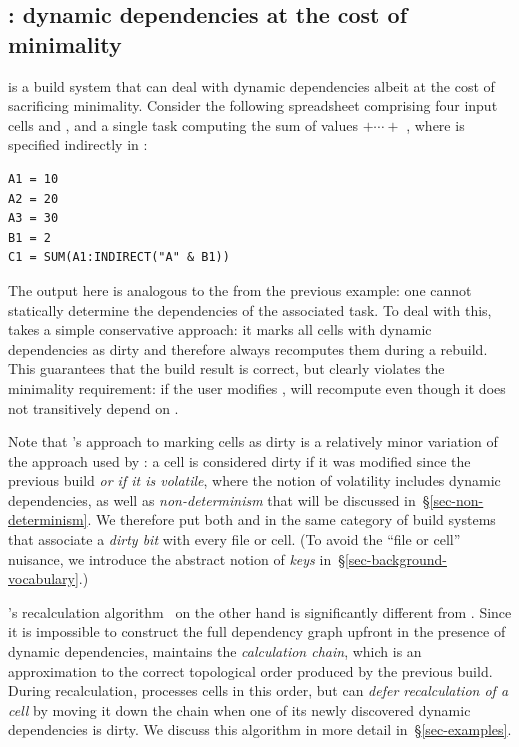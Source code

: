 \subsection{\Excel: dynamic dependencies at the cost of minimality}
\label{sec-background-excel}

\Excel is a build system that can deal with dynamic dependencies albeit at the
cost of sacrificing minimality. Consider the following spreadsheet comprising
four input cells  and , and a single task computing the sum
of values  $+\cdots+$ , where  is specified indirectly in
:

\vspace{1mm}
\begin{verbatim}
A1 = 10
A2 = 20
A3 = 30
B1 = 2
C1 = SUM(A1:INDIRECT("A" & B1))
\end{verbatim}
\vspace{1mm}

\noindent
The output  here is analogous to the  from the previous
example: one cannot statically determine the dependencies of the associated task.
To deal with this, \Excel takes a simple conservative approach: it marks all
cells with dynamic dependencies as dirty and therefore always recomputes them
during a rebuild. This guarantees that the build result is correct, but clearly
violates the minimality requirement: if the user modifies , \Excel will
recompute  even though it does not transitively depend on .

Note that \Excel's approach to marking cells as dirty is a relatively minor
variation of the approach used by \Make: a cell is considered dirty if it was
modified since the previous build \emph{or if it is volatile}, where the notion
of volatility includes dynamic dependencies, as well as \emph{non-determinism}
that will be discussed in~\S\ref{sec-non-determinism}. We therefore put both
\Make and \Excel in the same category of build systems that associate a
\emph{dirty bit} with every file or cell. (To avoid the ``file or cell''
nuisance, we introduce the abstract notion of \emph{keys}
in~\S\ref{sec-background-vocabulary}.)

\Excel's recalculation algorithm~\cite{excel_recalc} on the other hand is
significantly different from \Make. Since it is impossible to construct the full
dependency graph upfront in the presence of dynamic dependencies, \Excel
maintains the \emph{calculation chain}, which is an approximation to the correct
topological order produced by the previous build. During recalculation, \Excel
processes cells in this order, but can \emph{defer recalculation of a cell} by
moving it down the chain when one of its newly discovered dynamic dependencies
is dirty. We discuss this algorithm in more detail in~\S\ref{sec-examples}.

